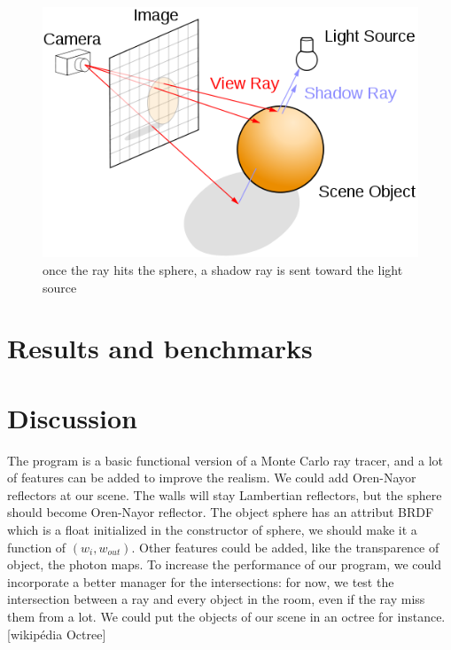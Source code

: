 \documentclass[12pt]{article}
\numberwithin{equation}{section}
\begin{document}
\begin{figure}
  \begin{center}
    \includegraphics[scale=0.5]{500px-Ray_trace_diagram.png}
    \caption{once the ray hits the sphere, a shadow ray is sent toward the light source}
    \label{fig:4}
  \end{center}
\end{figure}

\section{Results and benchmarks}


\section{Discussion}

The program is a basic functional version of a Monte Carlo ray tracer, and a lot of features can be added to improve the realism. We could add Oren-Nayor reflectors at our scene. The walls will stay Lambertian reflectors, but the sphere should become Oren-Nayor reflector. The object sphere has an attribut BRDF which is a float initialized in the
constructor of sphere, we should make it a function of $(w_i, w_{out})$. Other features could be added, like the transparence of object, the photon maps. To increase the performance of our program, we could incorporate a better manager for the intersections: for now, we test the intersection between a ray and every object in the room, even if the ray miss them from a lot. We could put the objects of our scene in an octree for instance.[wikipédia Octree] 
\end{document}
